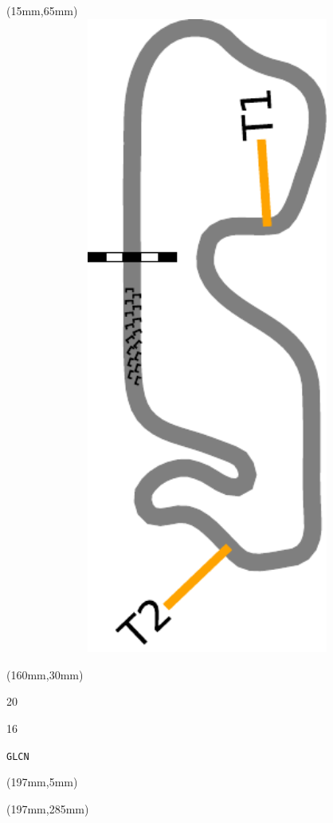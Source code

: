 \begin{textblock*}{185mm}(15mm,65mm)%
\centering
\mbox{\includegraphics[width=185mm,height=210mm,keepaspectratio]{PT/GLCN.pdf}}
\end{textblock*}
\begin{textblock*}{40mm}(160mm,30mm)%
\Large
\par{} 
\par20 
\par16 
\par\hfill\tiny\tt GLCN\\
\end{textblock*}
\begin{textblock*}{20mm}(197mm,5mm)%
\fbox{\thepage}
\label{GLCN}
\end{textblock*}
\begin{textblock*}{20mm}(197mm,285mm)%
\fbox{\thepage}
\end{textblock*}

